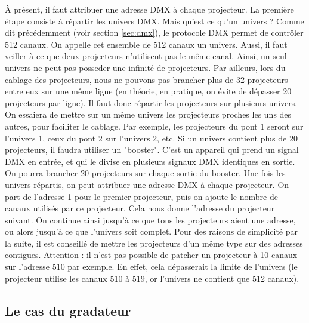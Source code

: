 À présent, il faut attribuer une adresse DMX à chaque projecteur.
La première étape consiste à répartir les univers DMX. Mais qu'est ce qu'un univers ?
\newline
Comme dit précédemment (voir section \ref{sec:dmx}), le protocole DMX permet de contrôler 512 canaux. On appelle cet ensemble de 512 canaux un univers.
Aussi, il faut veiller à ce que deux projecteurs n'utilisent pas le même canal.
Ainsi, un seul univers ne peut pas posseder une infinité de projecteurs.
Par ailleurs, lors du cablage des projecteurs, nous ne pouvons pas brancher plus de 32 projecteurs entre eux sur une même ligne (en théorie, en pratique, on évite de dépasser 20 projecteurs par ligne).
Il faut donc répartir les projecteurs sur plusieurs univers.
\newline
\newline
On essaiera de mettre sur un même univers les projecteurs proches les uns des autres, pour faciliter le cablage.
Par exemple, les projecteurs du pont 1 seront sur l'univers 1, ceux du pont 2 sur l'univers 2, etc.
\newline
Si un univers contient plus de 20 projecteurs, il faudra utiliser un "booster". C'est un appareil qui prend un signal DMX en entrée, et qui le divise en plusieurs signaux DMX identiques en sortie.
On pourra brancher 20 projecteurs sur chaque sortie du booster.
\newline
\newline
Une fois les univers répartis, on peut attribuer une adresse DMX à chaque projecteur.
On part de l'adresse 1 pour le premier projecteur, puis on ajoute le nombre de canaux utilisés par ce projecteur.
Cela nous donne l'adresse du projecteur suivant.
On continue ainsi jusqu'à ce que tous les projecteurs aient une adresse, ou alors jusqu'à ce que l'univers soit complet.
\newline
Pour des raisons de simplicité par la suite, il est conseillé de mettre les projecteurs d'un même type sur des adresses contigues.
\newline
Attention : il n'est pas possible de patcher un projecteur à 10 canaux sur l'adresse 510 par exemple. En effet, cela dépasserait la limite de l'univers (le projecteur utilise les canaux 510 à 519, or l'univers ne contient que 512 canaux).

\subsection{Le cas du gradateur}
\label{subsec:patch_gradateur}

